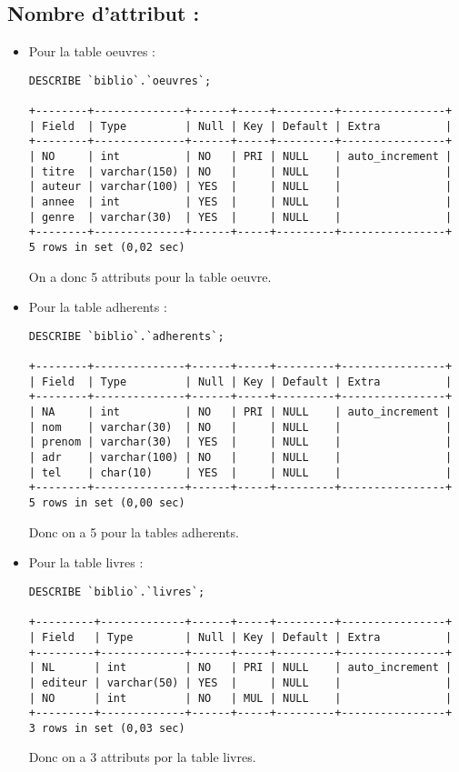 \documentclass[11]{article}
\begin{document}
\subsection{Nombre d'attribut :}
\begin{itemize}
	\item Pour la table oeuvres :
	      \begin{verbatim}
DESCRIBE `biblio`.`oeuvres`;

+--------+--------------+------+-----+---------+----------------+
| Field  | Type         | Null | Key | Default | Extra          |
+--------+--------------+------+-----+---------+----------------+
| NO     | int          | NO   | PRI | NULL    | auto_increment |
| titre  | varchar(150) | NO   |     | NULL    |                |
| auteur | varchar(100) | YES  |     | NULL    |                |
| annee  | int          | YES  |     | NULL    |                |
| genre  | varchar(30)  | YES  |     | NULL    |                |
+--------+--------------+------+-----+---------+----------------+
5 rows in set (0,02 sec)
\end{verbatim}
	      On a donc 5 attributs pour la table oeuvre.

	\item Pour la table adherents :
	      \begin{verbatim}
DESCRIBE `biblio`.`adherents`;

+--------+--------------+------+-----+---------+----------------+
| Field  | Type         | Null | Key | Default | Extra          |
+--------+--------------+------+-----+---------+----------------+
| NA     | int          | NO   | PRI | NULL    | auto_increment |
| nom    | varchar(30)  | NO   |     | NULL    |                |
| prenom | varchar(30)  | YES  |     | NULL    |                |
| adr    | varchar(100) | NO   |     | NULL    |                |
| tel    | char(10)     | YES  |     | NULL    |                |
+--------+--------------+------+-----+---------+----------------+
5 rows in set (0,00 sec)
\end{verbatim}

	      Donc on a 5 pour la tables adherents.
	\item Pour la table livres :
	      \begin{verbatim}
DESCRIBE `biblio`.`livres`;

+---------+-------------+------+-----+---------+----------------+
| Field   | Type        | Null | Key | Default | Extra          |
+---------+-------------+------+-----+---------+----------------+
| NL      | int         | NO   | PRI | NULL    | auto_increment |
| editeur | varchar(50) | YES  |     | NULL    |                |
| NO      | int         | NO   | MUL | NULL    |                |
+---------+-------------+------+-----+---------+----------------+
3 rows in set (0,03 sec)
\end{verbatim}
	      Donc on a 3 attributs por la table livres.


\end{itemize}
\end{document}
